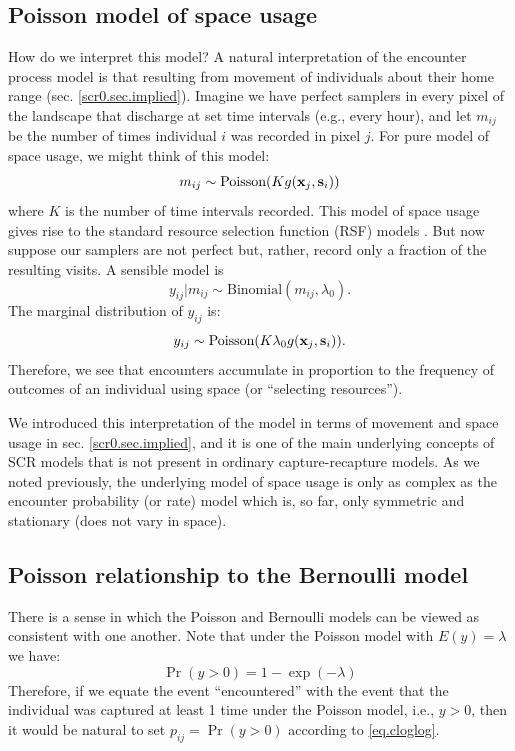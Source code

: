 \subsection{Poisson model of space usage}

How do we interpret this model?  A natural interpretation of the
encounter process model is that resulting from movement of individuals
about their home range (sec. \ref{scr0.sec.implied}).  Imagine we have
perfect samplers in every pixel of the landscape that discharge at set
time intervals (e.g., every hour), and let $m_{ij}$ be the number of
times individual $i$ was recorded in pixel $j$. For pure model of
space usage, we might think of this model:
\[
m_{ij} \sim  \mbox{Poisson}(K  g({\bf x}_{j},{\bf s}_{i}) )
\]
where $K$ is the number of time intervals recorded. This model of
space usage gives rise to the standard resource selection function
(RSF) models \citep[][and Chapt. \ref{chapt.rsf}]{royle_etal:2012mee}.
But now suppose our samplers are not perfect but, rather, record only
a fraction of the resulting visits. A sensible model is
\[
 y_{ij}|m_{ij} \sim \mbox{Binomial}(m_{ij}, \lambda_{0}).
\]
The marginal distribution of $y_{ij}$ is:
\[
 y_{ij} \sim \mbox{Poisson}(K \lambda_{0} g({\bf x}_{j},{\bf s}_{i}) ).
\]
Therefore, we see that encounters accumulate in proportion to the
frequency of outcomes of an individual using space (or ``selecting
resources'').

We introduced this interpretation of the model in terms of movement
and space usage in sec. \ref{scr0.sec.implied}, and it is one of the
main underlying concepts of SCR models that is not present in ordinary
capture-recapture models. As we noted previously, the underlying model
of space usage is only as complex as the encounter probability (or
rate) model which is, so far, only symmetric and stationary (does not
vary in space). 




\subsection{Poisson relationship to the Bernoulli model}
\label{poisson-mn.sec.approx}

There is a sense in which the Poisson and Bernoulli models can
be viewed as consistent with one another. Note that under the Poisson
model with $E(y) = \lambda$ we have:
\begin{equation}
 \Pr(y>0) = 1-\exp(-\lambda)
\label{eq.cloglog}
\end{equation}
Therefore, if we equate the event ``encountered'' with the event that
the individual was captured at least 1 time under the Poisson model,
i.e., $y>0$, then it would be natural to set $p_{ij} = \Pr(y>0)$
according to \ref{eq.cloglog}.

